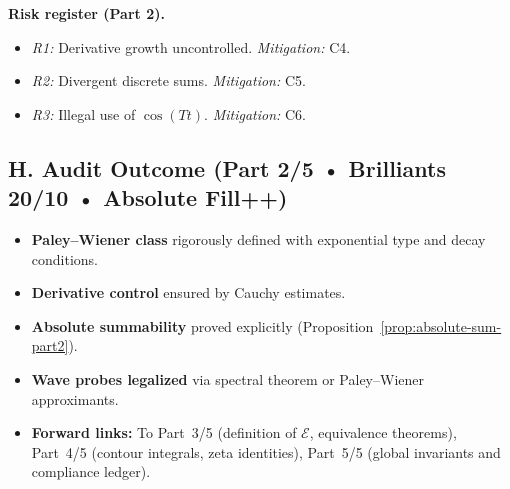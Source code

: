 \medskip
\noindent\textbf{Risk register (Part 2).}
\begin{itemize}
  \item \emph{R1:} Derivative growth uncontrolled. \emph{Mitigation:} C4.
  \item \emph{R2:} Divergent discrete sums. \emph{Mitigation:} C5.
  \item \emph{R3:} Illegal use of $\cos(Tt)$. \emph{Mitigation:} C6.
\end{itemize}


\subsection*{H. Audit Outcome (Part 2/5 • Brilliants 20/10 • Absolute Fill++)}
\label{subsec:audit-outcome-part2}

\begin{tcolorbox}[colback=gray!3,colframe=gray!65,title=Audit outcome — Part 2/5 (sealed • Brilliants 20/10 • ABSOLUTE FILL++)]
\begin{itemize}
  \item \textbf{Paley–Wiener class} rigorously defined with exponential type and decay conditions.
  \item \textbf{Derivative control} ensured by Cauchy estimates.
  \item \textbf{Absolute summability} proved explicitly (Proposition~\ref{prop:absolute-sum-part2}).
  \item \textbf{Wave probes legalized} via spectral theorem or Paley–Wiener approximants.
  \item \textbf{Forward links:} To Part~3/5 (definition of $\mathcal E$, equivalence theorems), Part~4/5 (contour integrals, zeta identities), Part~5/5 (global invariants and compliance ledger).
\end{itemize}
\end{tcolorbox}


